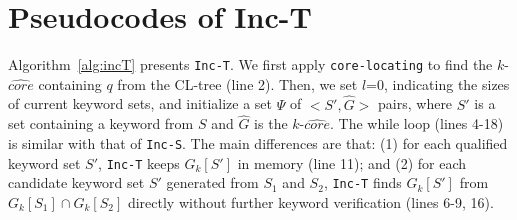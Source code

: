 \section{Pseudocodes of Inc-T}
\label{app:inct}

Algorithm~\ref{alg:incT} presents {\tt Inc-T}.
We first apply {\tt core-locating} to find the $k$-$\widehat{core}$ containing $q$ from the CL-tree (line 2).
Then, we set $l$=0, indicating the sizes of current keyword sets,
and initialize a set $\Psi$ of $<S',\widehat G>$ pairs,
where $S'$ is a set containing a keyword from $S$ and $\widehat G$ is the $k$-$\widehat {core}$.
The while loop (lines 4-18) is similar with that of {\tt Inc-S}.
The main differences are that:
(1) for each qualified keyword set $S'$, {\tt Inc-T} keeps $G_k[S']$ in memory (line 11);
and (2) for each candidate keyword set $S'$ generated from $S_1$ and $S_2$,
{\tt Inc-T} finds $G_k[S']$ from $G_k[S_1]\cap G_k[S_2]$ directly without further keyword verification (lines 6-9, 16).

